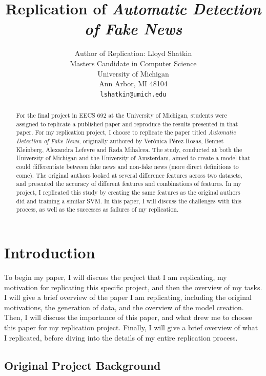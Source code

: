 \documentclass{article}
\title{Replication of \emph{Automatic Detection of Fake News}}
\author{
  Author of Replication: Lloyd Shatkin \\
   Masters Candidate in Computer Science \\
   University of Michigan \\
   Ann Arbor, MI 48104 \\
  \texttt{lshatkin@umich.edu} \\
}
\begin{document}
\maketitle

\begin{abstract}
For the final project in EECS 692 at the University of Michigan, students were assigned to replicate a published paper and reproduce the results presented in that paper. For my replication project, I choose to replicate the paper titled \emph{Automatic Detection of Fake News}, originally authored by Ver\'onica P\'erez-Rosas, Bennet Kleinberg, Alexandra Lefevre and Rada Mihalcea. The study, conducted at both the University of Michigan and the University of Amsterdam, aimed to create a model that could differentiate between fake news and non-fake news (more direct definitions to come). The original authors looked at several difference features across two datasets, and presented the accuracy of different features and combinations of features. In my project, I replicated this study by creating the same features as the original authors did and training a similar SVM. In this paper, I will discuss the challenges with this process, as well as the successes as failures of my replication. 
\end{abstract}


\section{Introduction}

To begin my paper, I will discuss the project that I am replicating, my motivation for replicating this specific project, and then the overview of my tasks. I will give a brief overview of the paper I am replicating, including the original motivations, the generation of data, and the overview of the model creation. Then, I will discuss the importance of this paper, and what drew me to choose this paper for my replication project. Finally, I will give a brief overview of what I replicated, before diving into the details of my entire replication process.

\subsection{Original Project Background}
\end{document}
